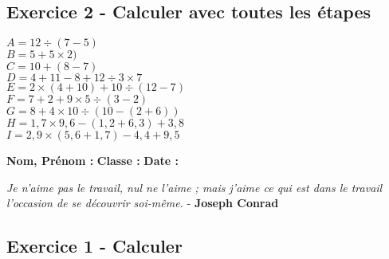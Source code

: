 \documentclass[11pt]{article}
\begin{document}
\subsection*{Exercice 2 - Calculer avec toutes les étapes}

\begin{multicols}{3}
  \noindent
  $A = 12\div (7-5)$ \\
  $B = 5 + 5 \times 2)$ \\
  $C = 10+(8-7)$ \\
  $D = 4+11-8+12\div 3\times 7$ \\
  $E = 2\times (4+10)+10\div (12-7)$ \\
  $F = 7+2+9\times 5\div (3-2)$ \\
  $G = 8+4\times 10\div (10-(2+6))$ \\
  $H = 1{,}7\times 9{,}6-(1{,}2+6{,}3)+3{,}8$ \\
  $I = 2{,}9\times (5{,}6+1{,}7)-4{,}4+9{,}5$ 
\end{multicols}

\vspace{4cm}

\textbf{Nom, Prénom :} \hspace{8cm} \textbf{Classe :} \hspace{3cm} \textbf{Date :}\\
\vspace{-0.8cm}
\begin{center}
  \textit{Je n'aime pas le travail, nul ne l'aime ; mais j'aime ce qui est dans le travail l'occasion de se découvrir soi-même.}  - \textbf{Joseph Conrad}
\end{center}
\vspace{-0.8cm}

\subsection*{Exercice 1 - Calculer}
\end{document}
